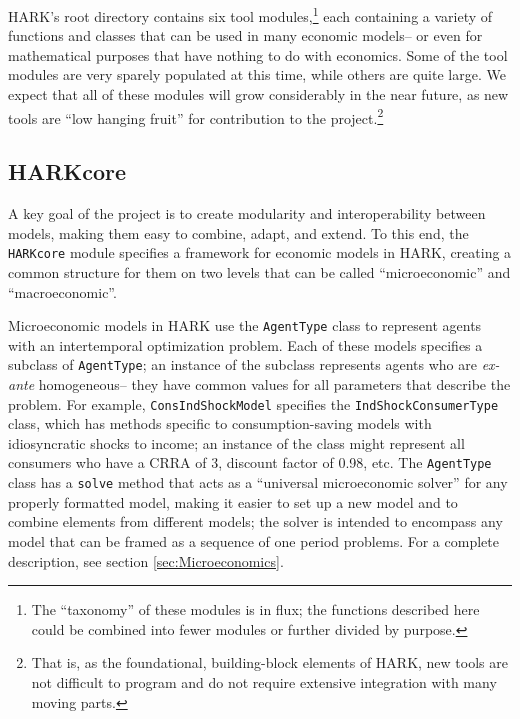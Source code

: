 \documentclass[12pt,titlepage,letterpaper]{econtex}
\begin{document}
HARK's root directory contains six tool modules,\footnote{The ``taxonomy'' of these modules is in flux; the functions described here could be combined into fewer modules or further divided by purpose.} each containing a variety of functions and classes that can be used in many economic models-- or even for mathematical purposes that have nothing to do with economics.  Some of the tool modules are very sparely populated at this time, while others are quite large.  We expect that all of these modules will grow considerably in the near future, as new tools are ``low hanging fruit'' for contribution to the project.\footnote{That is, as the foundational, building-block elements of HARK, new tools are not difficult to program and do not require extensive integration with many moving parts.}

\subsection{HARKcore}\label{sec:HARKcore}

A key goal of the project is to create modularity and interoperability between models, making them easy to combine, adapt, and extend.  To this end, the \texttt{HARKcore} module specifies a framework for economic models in HARK, creating a common structure for them on two levels that can be called ``microeconomic'' and ``macroeconomic''.

Microeconomic models in HARK use the \texttt{AgentType} class to represent agents with an intertemporal optimization problem.  Each of these models specifies a subclass of \texttt{AgentType}; an instance of the subclass represents agents who are \textit{ex-ante} homogeneous-- they have common values for all parameters that describe the problem.  For example, \texttt{ConsIndShockModel} specifies the \texttt{IndShockConsumerType} class, which has methods specific to consumption-saving models with idiosyncratic shocks to income; an instance of the class might represent all consumers who have a CRRA of 3, discount factor of 0.98, etc.  The \texttt{AgentType} class has a \texttt{solve} method that acts as a ``universal microeconomic solver'' for any properly formatted model, making it easier to set up a new model and to combine elements from different models; the solver is intended to encompass any model that can be framed as a sequence of one period problems.  For a complete description, see section \ref{sec:Microeconomics}.
\end{document}
